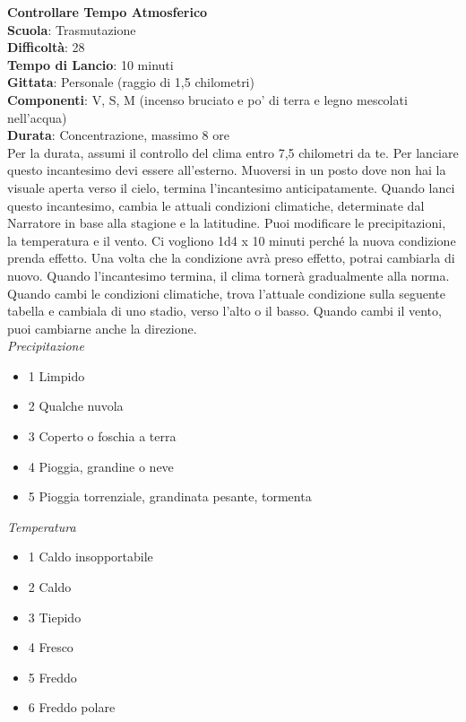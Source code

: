 \begin{multicols}{2}
\medskip\textbf{Controllare Tempo Atmosferico}\\
\textbf{Scuola}: Trasmutazione\\
\textbf{Difficoltà}: 28\\
\textbf{Tempo di Lancio}: 10 minuti\\
\textbf{Gittata}: Personale (raggio di 1,5 chilometri)\\
\textbf{Componenti}: V, S, M (incenso bruciato e po' di terra e legno mescolati nell'acqua)\\
\textbf{Durata}: Concentrazione, massimo 8 ore \\
Per la durata, assumi il controllo del clima entro 7,5 chilometri da te. Per lanciare questo incantesimo devi essere all'esterno. Muoversi in un posto dove non hai la visuale aperta verso il cielo, termina l'incantesimo anticipatamente. Quando lanci questo incantesimo, cambia le attuali condizioni climatiche, determinate dal Narratore in base alla stagione e la latitudine. Puoi modificare le precipitazioni, la temperatura e il vento. Ci vogliono 1d4 x 10 minuti perché la nuova condizione prenda effetto. Una volta che la condizione avrà preso effetto, potrai cambiarla di nuovo. Quando l'incantesimo termina, il clima tornerà gradualmente alla norma.\\
Quando cambi le condizioni climatiche, trova l'attuale condizione sulla seguente tabella e cambiala di uno stadio, verso l'alto o il basso. Quando cambi il vento, puoi cambiarne anche la direzione. \\
\medskip
\textit{Precipitazione}
\begin{itemize}
	\item 
1 Limpido
	\item 
2 Qualche nuvola
	\item 
3 Coperto o foschia a terra
	\item 
4 Pioggia, grandine o neve
	\item 
5 Pioggia torrenziale, grandinata pesante, tormenta
\end{itemize}

\textit{Temperatura}

\begin{itemize}
 \item 
1 Caldo insopportabile
	\item 
2 Caldo
	\item 
3 Tiepido
	\item 
4 Fresco
	\item 
5 Freddo
	\item 
6 Freddo polare
\end{itemize}


\end{multicols}
